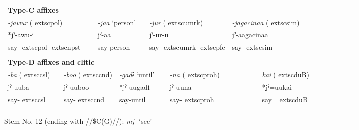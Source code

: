 \begin{tabularx}{\textwidth}{XXm{}XXXXXXXXXXXXXXXXXXXX}
\multicolumn{23}{X}{{\bfseries Type-C affixes}}\\
\multicolumn{4}{X}{{ \textit{{}-jawur} (	extsc{pol})}} & \multicolumn{3}{X}{{ \textit{{}-jaa} ‘person’}} & \multicolumn{5}{X}{{ \textit{{}-jur} (	extsc{umrk})}} & \multicolumn{4}{X}{{ \textit{{}-jagacinaa} (	extsc{sim})}} & \multicolumn{7}{X}{}\\
\multicolumn{4}{X}{{ *jˀ-awu-i}} & \multicolumn{3}{X}{jˀ-aa} & \multicolumn{5}{X}{jˀ-ur-u} & \multicolumn{4}{X}{{ jˀ-aagacinaa}} & \multicolumn{7}{X}{}\\
\multicolumn{4}{X}{say-	extsc{pol}-	extsc{npst}} & \multicolumn{3}{X}{say-person} & \multicolumn{5}{X}{say-	extsc{umrk}-	extsc{pfc}} & \multicolumn{4}{X}{say-	extsc{sim}} & \multicolumn{7}{X}{}\\
\multicolumn{23}{X}{}\\
\multicolumn{23}{X}{{\bfseries Type-D affixes and clitic}}\\
{ \textit{{}-ba} (	extsc{csl})} & \multicolumn{4}{X}{{ \textit{{}-boo} (	extsc{cnd})}} & \multicolumn{4}{X}{{ \textit{{}-gadɨ} ‘until’}} & \multicolumn{4}{X}{{ \textit{{}-na} (	extsc{proh})}} & \multicolumn{4}{X}{{ \textit{kai} (	extsc{du}B)}} & \multicolumn{6}{X}{}\\
{ jˀ-uuba} & \multicolumn{4}{X}{{ jˀ-uuboo}} & \multicolumn{4}{X}{{ *jˀ-uugadɨ}} & \multicolumn{4}{X}{{ jˀ-uuna}} & \multicolumn{4}{X}{{ *jˀ=uukai}} & \multicolumn{6}{X}{}\\
say-	extsc{csl} & \multicolumn{4}{X}{say-	extsc{cnd}} & \multicolumn{4}{X}{say-until} & \multicolumn{4}{X}{say-	extsc{proh}} & \multicolumn{4}{X}{say=	extsc{du}B} & \multicolumn{6}{X}{}\\
\lspbottomrule
\end{tabularx}
Stem No. 12 (ending with //\$C(G)//): \textit{mj-} ‘see’

\tablefirsthead{}

